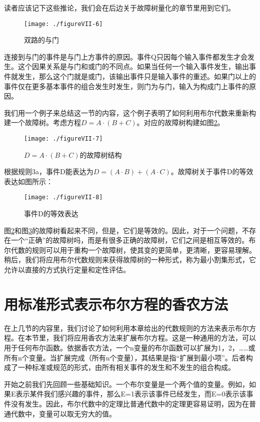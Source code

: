 \documentclass[cn,11pt,chinese]{elegantbook}
\begin{document}
{读者应该记下这些推论，我们会在后边关于故障树量化的章节里用到它们。

\begin{figure}
	\texttt{[image: ./figureVII-6]}
	\caption{双路的与门}\label{fig7-6}
\end{figure}

连接到与门的事件是与门上方事件的原因。事件Q只因每个输入事件都发生才会发生。这个因果关系是与门和或门的不同点。如果当任何一个输入事件发生，输出事件就发生，那么这个门就是或门，该输出事件只是输入事件的重述。如果门以上的事件仅在更多基本事件的组合发生时发生，则门为与门，输入为构成门上事件的原因。

我们用一个例子来总结这一节的内容，这个例子表明了如何利用布尔代数来重新构建一个故障树。考虑方程$D=A \cdot (B+C)$。对应的故障树构建如图\ref{fig7-7}。

\begin{figure}
	\texttt{[image: ./figureVII-7]}
	\caption{$D=A\cdot(B+C)$的故障树结构}
	\label{fig7-7}
\end{figure}
根据规则3a，事件D能表达为$D=(A \cdot B)+(A \cdot C)$。故障树关于事件D的等效表达如图所示：

\begin{figure}
	\texttt{[image: ./figureVII-8]}
	\caption{事件D的等效表达}
	\label{fig7-8}
\end{figure}


图\ref{fig7-7}和图\ref{fig7-8}的故障树看起来不同，但是，它们是等效的。因此，对于一个问题，不存在一个“正确”的故障树吗，而是有很多正确的故障树，它们之间是相互等效的。布尔代数的规则可以用于重构一个故障树，使其变的更简单，更清晰，更容易理解。稍后，我们将应用布尔代数规则来获得故障树的一种形式，称为最小割集形式，它允许以直接的方式执行定量和定性评估。

\section{用标准形式表示布尔方程的香农方法}

在上几节的内容里，我们讨论了如何利用本章给出的代数规则的方法来表示布尔方程。在本节里，我们将应用香农方法来扩展布尔方程。这是一种通用的方法，可以用于任何布尔函数。依据香农方法，一个n变量的布尔函数可以扩展为1，2，……或所有n个变量。当扩展完成（所有n个变量），其结果是指“扩展到最小项”。后者构成了一种标准或规范的形式，由所有相关事件的发生和不发生的组合构成。

开始之前我们先回顾一些基础知识。一个布尔变量是一个两个值的变量。例如，如果E表示某件我们感兴趣的事件，那么E=1表示该事件已经发生，而E=0表示该事件没有发生。因此，布尔代数中的定理比普通代数中的定理更容易证明，因为在普通代数中，变量可以取无穷大的值。

}
\end{document}
